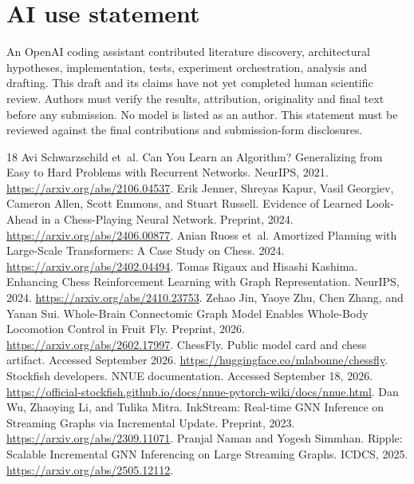 \documentclass{article}
\begin{document}
\section*{AI use statement}
An OpenAI coding assistant contributed literature discovery, architectural
hypotheses, implementation, tests, experiment orchestration, analysis and drafting.
This draft and its claims have not yet completed human scientific review. Authors
must verify the results, attribution, originality and final text before any
submission. No model is listed as an author. This statement must be reviewed
against the final contributions and submission-form disclosures.

\begingroup\raggedright
\begin{thebibliography}{18}
Avi Schwarzschild et~al. Can You Learn an Algorithm? Generalizing from Easy to
Hard Problems with Recurrent Networks. NeurIPS, 2021.
\url{https://arxiv.org/abs/2106.04537}.
Erik Jenner, Shreyas Kapur, Vasil Georgiev, Cameron Allen, Scott Emmons, and
Stuart Russell. Evidence of Learned Look-Ahead in a Chess-Playing Neural
Network. Preprint, 2024. \url{https://arxiv.org/abs/2406.00877}.
Anian Ruoss et~al. Amortized Planning with Large-Scale Transformers: A Case Study
on Chess. 2024. \url{https://arxiv.org/abs/2402.04494}.
Tomas Rigaux and Hisashi Kashima. Enhancing Chess Reinforcement Learning with
Graph Representation. NeurIPS, 2024. \url{https://arxiv.org/abs/2410.23753}.
Zehao Jin, Yaoye Zhu, Chen Zhang, and Yanan Sui. Whole-Brain Connectomic Graph
Model Enables Whole-Body Locomotion Control in Fruit Fly. Preprint, 2026.
\url{https://arxiv.org/abs/2602.17997}.
ChessFly. Public model card and chess artifact. Accessed September 2026.
\url{https://huggingface.co/mlabonne/chessfly}.
Stockfish developers. NNUE documentation. Accessed September 18, 2026.
\url{https://official-stockfish.github.io/docs/nnue-pytorch-wiki/docs/nnue.html}.
Dan Wu, Zhaoying Li, and Tulika Mitra. InkStream: Real-time GNN Inference on
Streaming Graphs via Incremental Update. Preprint, 2023.
\url{https://arxiv.org/abs/2309.11071}.
Pranjal Naman and Yogesh Simmhan. Ripple: Scalable Incremental GNN Inferencing on
Large Streaming Graphs. ICDCS, 2025. \url{https://arxiv.org/abs/2505.12112}.

\end{thebibliography}
\end{document}
